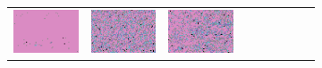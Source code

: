 \documentclass{ipol}
\begin{document}
\begin{figure}[ht]
\begin{subfigure}[t]{\linewidth}
\begin{tabular}{ccccccccc}
                \includegraphics[width=\s]{images/tower/LINEAR/iso_n5_64_grids.png}&
                \includegraphics[width=\s]{images/tower/PPG/iso_n5_64_grids.png}&
                \includegraphics[width=\s]{images/tower/VNG/iso_n5_64_grids.png}\\

\end{tabular}
\end{subfigure}
\end{figure}
\end{document}
